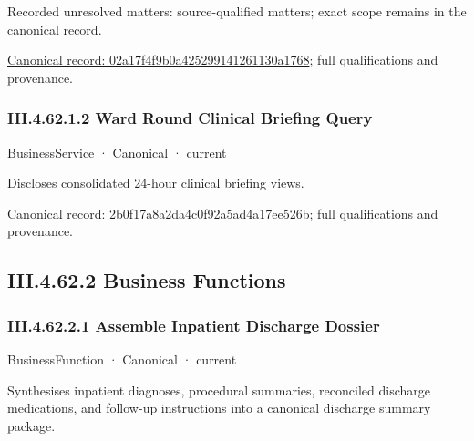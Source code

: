 {\small Recorded unresolved matters: source-qualified matters; exact scope remains in the canonical record.}\par
{\footnotesize \href{../../../../continuum/business/business-service/02a17f4f9b0a425299141261130a1768.md}{Canonical record: 02a17f4f9b0a425299141261130a1768}; full qualifications and provenance.}\par
\subsubsection*{III.4.62.1.2 Ward Round Clinical Briefing Query}
\label{navigation:III.4.62.1.2}

\label{element:2b0f17a8a2da4c0f92a5ad4a17ee526b}
{\small BusinessService · Canonical · current}\par

Discloses consolidated 24-hour clinical briefing views.


{\footnotesize \href{../../../../continuum/business/business-service/2b0f17a8a2da4c0f92a5ad4a17ee526b.md}{Canonical record: 2b0f17a8a2da4c0f92a5ad4a17ee526b}; full qualifications and provenance.}\par
\subsection*{III.4.62.2 Business Functions}
\label{navigation:III.4.62.2}

\subsubsection*{III.4.62.2.1 Assemble Inpatient Discharge Dossier}
\label{navigation:III.4.62.2.1}

\label{element:eeefe77a935a46aface61aca4e2bcfb6}
{\small BusinessFunction · Canonical · current}\par

Synthesises inpatient diagnoses, procedural summaries, reconciled discharge medications, and follow-up instructions into a canonical discharge summary package.



